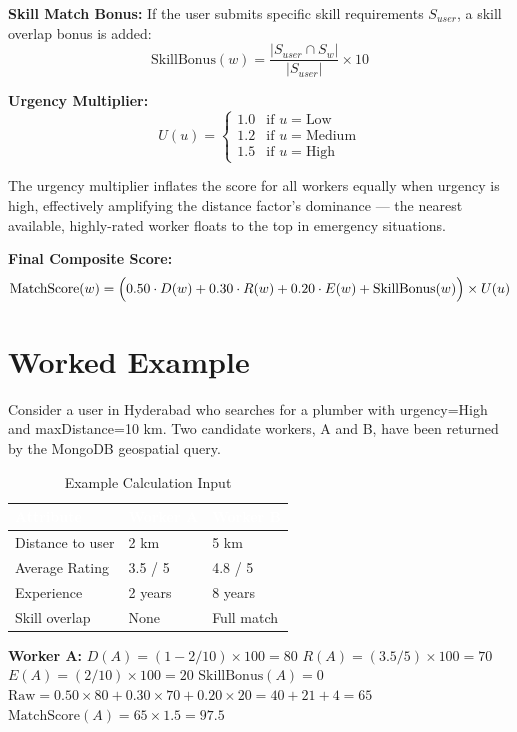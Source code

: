 \documentclass[12pt,a4paper]{report}
\newcommand{\thead}[1]{\cellcolor{tableheader}\textcolor{white}{\textbf{#1}}}
\begin{document}
\textbf{Skill Match Bonus:} If the user submits specific skill requirements $S_{user}$, a skill overlap bonus is added:
$$\text{SkillBonus}(w) = \frac{|S_{user} \cap S_w|}{|S_{user}|} \times 10$$

\textbf{Urgency Multiplier:}
$$U(u) = \begin{cases} 1.0 & \text{if } u = \text{Low} \\ 1.2 & \text{if } u = \text{Medium} \\ 1.5 & \text{if } u = \text{High} \end{cases}$$

The urgency multiplier inflates the score for all workers equally when urgency is high, effectively amplifying the distance factor's dominance — the nearest available, highly-rated worker floats to the top in emergency situations.

\textbf{Final Composite Score:}
$$\text{MatchScore}(w) = \Bigl(0.50 \cdot D(w) + 0.30 \cdot R(w) + 0.20 \cdot E(w) + \text{SkillBonus}(w)\Bigr) \times U(u)$$

\section{Worked Example}

Consider a user in Hyderabad who searches for a plumber with urgency=High and maxDistance=10 km. Two candidate workers, A and B, have been returned by the MongoDB geospatial query.

\begin{table}[h!]
\centering
\caption{Example Calculation Input}
\renewcommand{\arraystretch}{1.3}
\begin{tabular}{|p{3.5cm}|p{2.5cm}|p{2.5cm}|}
\hline
\thead{Attribute} & \thead{Worker A} & \thead{Worker B} \\
\hline
Distance to user & 2 km & 5 km \\
Average Rating & 3.5 / 5 & 4.8 / 5 \\
Experience & 2 years & 8 years \\
Skill overlap & None & Full match \\
\hline
\end{tabular}
\end{table}

\textbf{Worker A:}
$D(A) = (1 - 2/10) \times 100 = 80$
$R(A) = (3.5/5) \times 100 = 70$
$E(A) = (2/10) \times 100 = 20$
$\text{SkillBonus}(A) = 0$
$\text{Raw} = 0.50 \times 80 + 0.30 \times 70 + 0.20 \times 20 = 40 + 21 + 4 = 65$
$\text{MatchScore}(A) = 65 \times 1.5 = \mathbf{97.5}$
\end{document}
